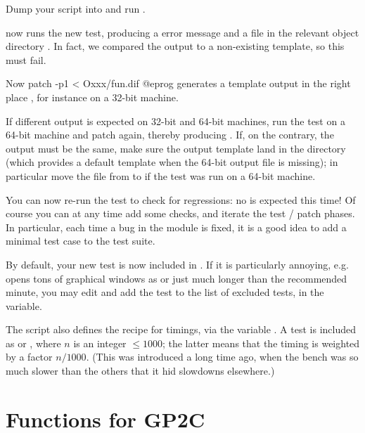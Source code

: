 \item Dump your script into  and run .

\item {} now runs the new test, producing a \kbd{[BUG]} error
message and a  file in the relevant object directory .
In fact, we compared the output to a non-existing template, so this must fail.

\item Now
\bprog
  patch -p1 < Oxxx/fun.dif
@eprog\noindent
generates a template output in the right place , for
instance on a 32-bit machine.

\item If different output is expected on 32-bit and 64-bit machines, run the
test on a 64-bit machine and patch again, thereby
producing . If, on the contrary, the output must be the
same, make sure the output template land in the  directory
(which provides a default template when the 64-bit output file is missing);
in particular move the file from  to 
if the test was run on a 64-bit machine.

\item You can now re-run the test to check for regressions: no \kbd{[BUG]}
is expected this time! Of course you can at any time add some checks, and
iterate the test / patch phases. In particular, each time a bug in the
 module is fixed, it is a good idea to add a minimal test case to
the test suite.

\item By default, your new test is now included in . If
it is particularly annoying, e.g. opens tons of graphical windows as
 or just much longer than the recommended minute, you
may edit  and add the  test to the list of
excluded tests, in the  variable.

\item The  script also defines the recipe for
 timings, via the variable . A test is
included as  or , where $n$ is an integer $\leq 1000$;
the latter means that the timing is weighted by a factor $n/1000$. (This was
introduced a long time ago, when the  bench was so much slower
than the others that it hid slowdowns elsewhere.)

\section{Functions for GP2C}

